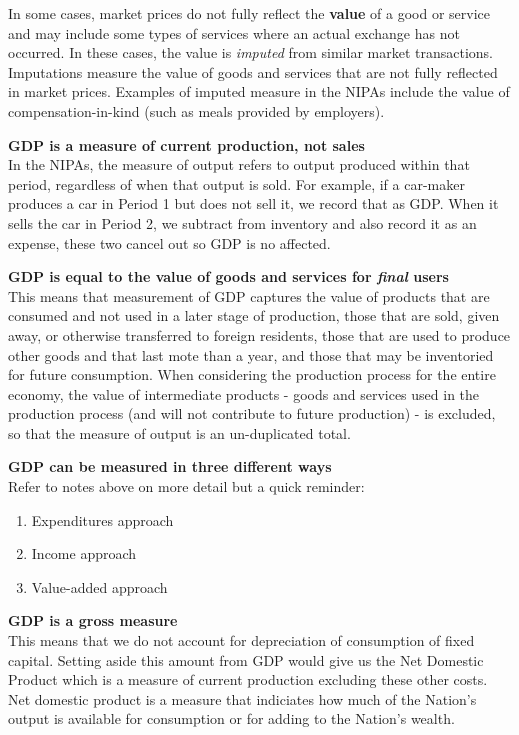 \documentclass[12pt, letterpaper]{article}
\begin{document}
{In some cases, market prices do not fully reflect the \textbf{value} of a good or service and may include some types of services where an actual exchange has not occurred. In these cases, the value is \textit{imputed} from similar market transactions. Imputations measure the value of goods and services that are not fully reflected in market prices. Examples of imputed measure in the NIPAs include the value of compensation-in-kind (such as meals provided by employers).

\vspace{10pt}
\noindent\textbf{GDP is a measure of current production, not sales}\\
In the NIPAs, the measure of output refers to output produced within that period, regardless of when that output is sold. For example, if a car-maker produces a car in Period 1 but does not sell it, we record that as GDP. When it sells the car in Period 2, we subtract from inventory and also record it as an expense, these two cancel out so GDP is no affected.

\vspace{10pt}
\noindent\textbf{GDP is equal to the value of goods and services for \textit{final} users}\\
This means that measurement of GDP captures the value of products that are consumed and not used in a later stage of production, those that are sold, given away, or otherwise transferred to foreign residents, those that are used to produce other goods and that last mote than a year, and those that may be inventoried for future consumption. When considering the production process for the entire economy, the value of intermediate products - goods and services used in the production process (and will not contribute to future production) - is excluded, so that the measure of output is an un-duplicated total. 

\vspace{10pt}
\noindent\textbf{GDP can be measured in three different ways}\\
Refer to notes above on more detail but a quick reminder:
\begin{enumerate}
	\item Expenditures approach
	\item Income approach
	\item Value-added approach
\end{enumerate}

\vspace{10pt}
\noindent\textbf{GDP is a gross measure}\\
This means that we do not account for depreciation of consumption of fixed capital. Setting aside this amount from GDP would give us the Net Domestic Product which is a measure of current production excluding these other costs. Net domestic product is a measure that indiciates how much of the Nation's output is available for consumption or for adding to the Nation's wealth.

}
\end{document}
